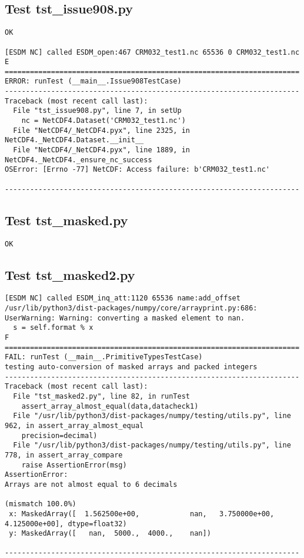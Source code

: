 \subsection{Test tst\_issue908.py}

\begin{verbatim}
OK

[ESDM NC] called ESDM_open:467 CRM032_test1.nc 65536 0 CRM032_test1.nc
E
======================================================================
ERROR: runTest (__main__.Issue908TestCase)
----------------------------------------------------------------------
Traceback (most recent call last):
  File "tst_issue908.py", line 7, in setUp
    nc = NetCDF4.Dataset('CRM032_test1.nc')
  File "NetCDF4/_NetCDF4.pyx", line 2325, in NetCDF4._NetCDF4.Dataset.__init__
  File "NetCDF4/_NetCDF4.pyx", line 1889, in NetCDF4._NetCDF4._ensure_nc_success
OSError: [Errno -77] NetCDF: Access failure: b'CRM032_test1.nc'

----------------------------------------------------------------------
\end{verbatim}

\subsection{Test tst\_masked.py}

\begin{verbatim}
OK
\end{verbatim}

\subsection{Test tst\_masked2.py}

\begin{verbatim}
[ESDM NC] called ESDM_inq_att:1120 65536 name:add_offset
/usr/lib/python3/dist-packages/numpy/core/arrayprint.py:686: UserWarning: Warning: converting a masked element to nan.
  s = self.format % x
F
======================================================================
FAIL: runTest (__main__.PrimitiveTypesTestCase)
testing auto-conversion of masked arrays and packed integers
----------------------------------------------------------------------
Traceback (most recent call last):
  File "tst_masked2.py", line 82, in runTest
    assert_array_almost_equal(data,datacheck1)
  File "/usr/lib/python3/dist-packages/numpy/testing/utils.py", line 962, in assert_array_almost_equal
    precision=decimal)
  File "/usr/lib/python3/dist-packages/numpy/testing/utils.py", line 778, in assert_array_compare
    raise AssertionError(msg)
AssertionError:
Arrays are not almost equal to 6 decimals

(mismatch 100.0%)
 x: MaskedArray([  1.562500e+00,            nan,   3.750000e+00,   4.125000e+00], dtype=float32)
 y: MaskedArray([   nan,  5000.,  4000.,    nan])

----------------------------------------------------------------------
\end{verbatim}

